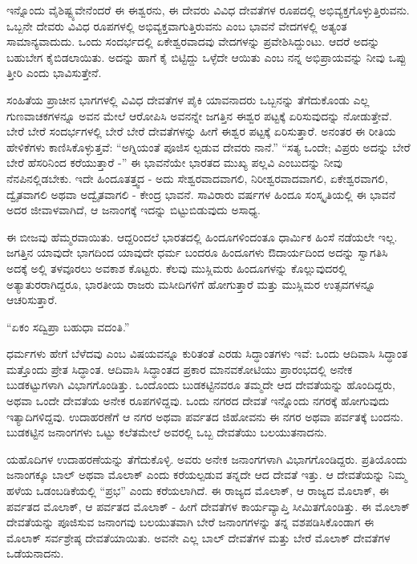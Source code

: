 ಇನ್ನೊಂದು ವೈಶಿಷ್ಟ್ಯವೇನೆಂದರೆ ಈ ಈಶ್ವರನು, ಈ ದೇವರು  ವಿವಿಧ ದೇವತೆಗಳ ರೂಪದಲ್ಲಿ ಅಭಿವ್ಯಕ್ತಗೊಳ್ಳುತ್ತಿರುವನು. ಒಬ್ಬನೇ ದೇವರು ವಿವಿಧ ರೂಪಗಳಲ್ಲಿ ಅಭಿವ್ಯಕ್ತವಾಗುತ್ತಿರುವನು ಎಂಬ ಭಾವನೆ ವೇದಗಳಲ್ಲಿ ಅತ್ಯಂತ ಸಾಮಾನ್ಯವಾದುದು. ಒಂದು ಸಂದರ್ಭದಲ್ಲಿ ಏಕೇಶ್ವರವಾದವು ವೇದಗಳನ್ನು ಪ್ರವೇಶಿಸಿದ್ದುಂಟು. ಆದರೆ ಅದನ್ನು ಬಹುಬೇಗ ಕೈಬಿಡಲಾಯಿತು. ಅದನ್ನು ಹಾಗೆ ಕೈ ಬಿಟ್ಟಿದ್ದು ಒಳ್ಳೆದೇ ಆಯಿತು ಎಂಬ ನನ್ನ ಅಭಿಪ್ರಾಯವನ್ನು ನೀವು ಒಪ್ಪು ತ್ತೀರಿ ಎಂದು ಭಾವಿಸುತ್ತೇನೆ.

ಸಂಹಿತೆಯ ಪ್ರಾಚೀನ ಭಾಗಗಳಲ್ಲಿ ವಿವಿಧ ದೇವತೆಗಳ ಪೈಕಿ ಯಾವನಾದರು ಒಬ್ಬನನ್ನು ತೆಗೆದುಕೊಂಡು ಎಲ್ಲ ಗುಣವಾಚಕಗಳನ್ನೂ ಅವನ ಮೇಲೆ ಆರೋಪಿಸಿ ಅವನನ್ನೇ ಜಗತ್ತಿನ ಈಶ್ವರ ಪಟ್ಟಕ್ಕೆ ಏರಿಸುವುದನ್ನು ನೋಡುತ್ತೇವೆ. ಬೇರೆ ಬೇರೆ ಸಂದರ್ಭಗಳಲ್ಲಿ ಬೇರೆ ಬೇರೆ ದೇವತೆಗಳನ್ನು ಹೀಗೆ ಈಶ್ವರ ಪಟ್ಟಕ್ಕೆ ಏರಿಸುತ್ತಾರೆ. ಅನಂತರ ಈ ರೀತಿಯ ಹೇಳಿಕೆಗಳು ಕಾಣಿಸಿಕೊಳ್ಳುತ್ತವೆ: “ಅಗ್ನಿಯಂತೆ ಪೂಜಿಸ ಲ್ಪಡುವ ದೇವರು ನಾನೆ.” “ಸತ್ಯ ಒಂದೇ; ವಿಪ್ರರು ಅದನ್ನು ಬೇರೆ ಬೇರೆ ಹೆಸರಿನಿಂದ ಕರೆಯುತ್ತಾರೆ -” ಈ ಭಾವನೆಯೇ ಭಾರತದ ಮುಖ್ಯ ಪಲ್ಲವಿ ಎಂಬುದನ್ನು ನೀವು ನೆನಪಿನಲ್ಲಿಡಬೇಕು. ಇದೇ ಹಿಂದೂತತ್ತ್ವದ - ಅದು ಸೇಶ್ವರವಾದವಾಗಲಿ, ನಿರೀಶ್ವರವಾದವಾಗಲಿ, ಏಕೇಶ್ವರವಾಗಲಿ, ದ್ವೈತವಾಗಲಿ ಅಥವಾ ಅದ್ವೈತವಾಗಲಿ - ಕೇಂದ್ರ ಭಾವನೆ. ಸಾವಿರಾರು ವರ್ಷಗಳ ಹಿಂದೂ ಸಂಸ್ಕೃತಿಯಲ್ಲಿ ಈ ಭಾವನೆ ಅದರ ಜೀವಾಳವಾಗಿದೆ, ಆ ಜನಾಂಗಕ್ಕೆ ಇದನ್ನು ಬಿಟ್ಟುಬಿಡುವುದು ಅಸಾಧ್ಯ.

ಈ ಬೀಜವು ಹೆಮ್ಮರವಾಯಿತು. ಆದ್ದರಿಂದಲೆ ಭಾರತದಲ್ಲಿ ಹಿಂದೂಗಳಿಂದಂತೂ ಧಾರ್ಮಿಕ ಹಿಂಸೆ ನಡೆಯಲೇ ಇಲ್ಲ. ಜಗತ್ತಿನ ಯಾವುದೇ ಭಾಗದಿಂದ ಯಾವುದೇ ಧರ್ಮ ಬಂದರೂ ಹಿಂದೂಗಳು ಔದಾರ್ಯದಿಂದ ಅದನ್ನು ಸ್ವಾಗತಿಸಿ ಅದಕ್ಕೆ ಅಲ್ಲಿ ತಳವೂರಲು ಅವಕಾಶ ಕೊಟ್ಟರು. ಕೆಲವು ಮುಸ್ಲಿಮರು ಹಿಂದೂಗಳನ್ನು ಕೊಲ್ಲುವುದರಲ್ಲಿ ಅತ್ಯಾತುರರಾಗಿದ್ದರೂ, ಭಾರತೀಯ ರಾಜರು ಮಸೀದಿಗಳಿಗೆ ಹೋಗುತ್ತಾರೆ ಮತ್ತು ಮುಸ್ಲಿಮರ ಉತ್ಸವಗಳನ್ನೂ ಆಚರಿಸುತ್ತಾರೆ.

“ಏಕಂ ಸದ್ವಿಪ್ರಾ ಬಹುಧಾ ವದಂತಿ.”

ಧರ್ಮಗಳು ಹೇಗೆ ಬೆಳೆದವು ಎಂಬ ವಿಷಯವನ್ನೂ ಕುರಿತಂತೆ ಎರಡು ಸಿದ್ಧಾಂತಗಳು ಇವೆ: ಒಂದು ಆದಿವಾಸಿ ಸಿದ್ಧಾಂತ ಮತ್ತೊಂದು ಪ್ರೇತ ಸಿದ್ಧಾಂತ. ಆದಿವಾಸಿ ಸಿದ್ಧಾಂತದ ಪ್ರಕಾರ ಮಾನವಕೋಟಿಯು ಪ್ರಾರಂಭದಲ್ಲಿ ಅನೇಕ ಬುಡಕಟ್ಟುಗಳಾಗಿ ವಿಭಾಗಗೊಂಡಿತ್ತು. ಒಂದೊಂದು ಬುಡಕಟ್ಟಿನವರೂ ತಮ್ಮದೇ ಆದ ದೇವತೆಯನ್ನು ಹೊಂದಿದ್ದರು, ಅಥವಾ ಒಂದೇ ದೇವತೆಯ ಅನೇಕ ರೂಪಗಳಿದ್ದವು. ಒಂದು ನಗರದ ದೇವತೆ ಇನ್ನೊಂದು ನಗರಕ್ಕೆ ಹೋಗುವುದು ಇತ್ಯಾದಿಗಳಿದ್ದವು. ಉದಾಹರಣೆಗೆ ಆ ನಗರ ಅಥವಾ ಪರ್ವತದ ಜಿಹೋವನು ಈ ನಗರ ಅಥವಾ ಪರ್ವತಕ್ಕೆ ಬಂದನು. ಬುಡಕಟ್ಟಿನ ಜನಾಂಗಗಳು ಒಟ್ಟು ಕಲೆತಮೇಲೆ ಅವರಲ್ಲಿ ಒಬ್ಬ ದೇವತೆಯು ಬಲಯುತನಾದನು.

ಯಹೊದಿಗಳ ಉದಾಹರಣೆಯನ್ನು ತೆಗೆದುಕೊಳ್ಳಿ. ಅವರು ಅನೇಕ ಜನಾಂಗಗಳಾಗಿ ವಿಭಾಗಗೊಂಡಿದ್ದರು. ಪ್ರತಿಯೊಂದು ಜನಾಂಗಕ್ಕೂ ಬಾಲ್ ಅಥವಾ ಮೊಲಾಕ್ ಎಂದು ಕರೆಯಲ್ಪಡುವ ತನ್ನದೇ ಆದ ದೇವತೆ ಇತ್ತು. ಆ ದೇವತೆಯನ್ನು ನಿಮ್ಮ ಹಳೆಯ ಒಡಂಬಡಿಕೆಯಲ್ಲಿ “ಪ್ರಭ” ಎಂದು ಕರೆಯಲಾಗಿದೆ. ಈ ರಾಜ್ಯದ ಮೊಲಾಕ್, ಆ ರಾಜ್ಯದ ಮೊಲಾಕ್, ಈ ಪರ್ವತದ ಮೊಲಾಕ್, ಆ ಪರ್ವತದ ಮೊಲಾಕ್ - ಹೀಗೆ ದೇವತೆಗಳ ಕಾರ್ಯವ್ಯಾಪ್ತಿ ಸೀಮಿತಗೊಂಡಿತ್ತು. ಈ ಮೊಲಾಕ್ ದೇವತೆಯನ್ನು ಪೂಜಿಸುವ ಜನಾಂಗವು ಬಲಯುತವಾಗಿ ಬೇರೆ ಜನಾಂಗಗಳನ್ನು ತನ್ನ ವಶಪಡಿಸಿಕೊಂಡಾಗ ಈ ಮೊಲಾಕ್ ಸರ್ವಶ್ರೇಷ್ಠ ದೇವತೆಯಾಯಿತು. ಅವನೇ ಎಲ್ಲ ಬಾಲ್ ದೇವತೆಗಳ ಮತ್ತು ಬೇರೆ ಮೊಲಾಕ್ ದೇವತೆಗಳ ಒಡೆಯನಾದನು.

